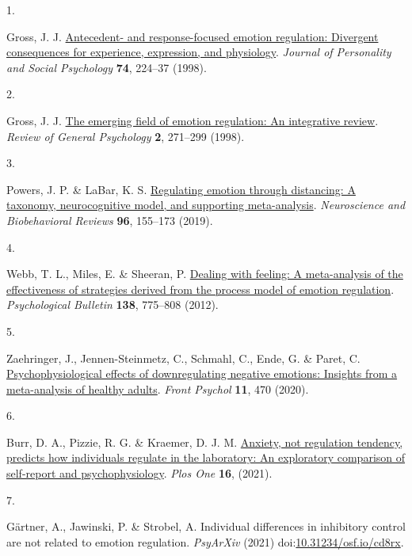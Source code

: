 \documentclass[
  man,floatsintext]{apa6}
\newlength{\cslhangindent}
\newlength{\csllabelwidth}
\newlength{\cslentryspacingunit} %
\newenvironment{CSLReferences}[2] %
 {%
  \setlength{\parindent}{0pt}
  \ifodd #1
  \let\oldpar\par
  \def\par{\hangindent=\cslhangindent\oldpar}
  \fi
  \setlength{\parskip}{#2\cslentryspacingunit}
 }%
 {}
\newcommand{\CSLLeftMargin}[1]{\parbox[t]{\csllabelwidth}{#1}}
\newcommand{\CSLRightInline}[1]{\parbox[t]{\linewidth - \csllabelwidth}{#1}\break}
\begin{document}
\hypertarget{refs}{}
\begin{CSLReferences}{0}{0}
\leavevmode{}%
\CSLLeftMargin{1. }%
\CSLRightInline{Gross, J. J. \href{https://doi.org/10.1037/0022-3514.74.1.224}{Antecedent- and response-focused emotion regulation: Divergent consequences for experience, expression, and physiology}. \emph{Journal of Personality and Social Psychology} \textbf{74}, 224--37 (1998).}

\leavevmode{}%
\CSLLeftMargin{2. }%
\CSLRightInline{Gross, J. J. \href{https://doi.org/10.1037/1089-2680.2.3.271}{The emerging field of emotion regulation: An integrative review}. \emph{Review of General Psychology} \textbf{2}, 271--299 (1998).}

\leavevmode{}%
\CSLLeftMargin{3. }%
\CSLRightInline{Powers, J. P. \& LaBar, K. S. \href{https://doi.org/10.1016/j.neubiorev.2018.04.023}{Regulating emotion through distancing: A taxonomy, neurocognitive model, and supporting meta-analysis}. \emph{Neuroscience and Biobehavioral Reviews} \textbf{96}, 155--173 (2019).}

\leavevmode{}%
\CSLLeftMargin{4. }%
\CSLRightInline{Webb, T. L., Miles, E. \& Sheeran, P. \href{https://doi.org/10.1037/a0027600}{Dealing with feeling: A meta-analysis of the effectiveness of strategies derived from the process model of emotion regulation}. \emph{Psychological Bulletin} \textbf{138}, 775--808 (2012).}

\leavevmode{}%
\CSLLeftMargin{5. }%
\CSLRightInline{Zaehringer, J., Jennen-Steinmetz, C., Schmahl, C., Ende, G. \& Paret, C. \href{https://doi.org/10.3389/fpsyg.2020.00470}{Psychophysiological effects of downregulating negative emotions: Insights from a meta-analysis of healthy adults}. \emph{Front Psychol} \textbf{11}, 470 (2020).}

\leavevmode{}%
\CSLLeftMargin{6. }%
\CSLRightInline{Burr, D. A., Pizzie, R. G. \& Kraemer, D. J. M. \href{https://doi.org/ARTN\%20e0247246\%0A10.1371/journal.pone.0247246}{Anxiety, not regulation tendency, predicts how individuals regulate in the laboratory: An exploratory comparison of self-report and psychophysiology}. \emph{Plos One} \textbf{16}, (2021).}

\leavevmode{}%
\CSLLeftMargin{7. }%
\CSLRightInline{Gärtner, A., Jawinski, P. \& Strobel, A. Individual differences in inhibitory control are not related to emotion regulation. \emph{PsyArXiv} (2021) doi:\href{https://doi.org/10.31234/osf.io/cd8rx}{10.31234/osf.io/cd8rx}.}


\end{CSLReferences}
\end{document}
